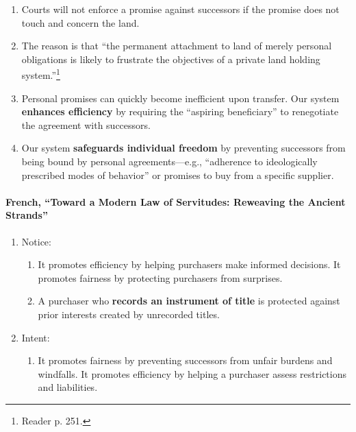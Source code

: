 \begin{enumerate}
    \item Courts will not enforce a promise against successors if the promise
    does not touch and concern the land.
    \item The reason is that ``the permanent attachment to land of merely 
    personal obligations is likely to frustrate the objectives of a private 
    land holding system.''\footnote{Reader p. 251.}
    \item Personal promises can quickly become inefficient upon transfer. Our 
    system \textbf{enhances efficiency} by requiring the ``aspiring 
    beneficiary'' to renegotiate the agreement with successors.
    \item Our system \textbf{safeguards individual freedom} by preventing 
    successors from being bound by personal agreements---e.g., ``adherence to 
    ideologically prescribed modes of behavior'' or promises to buy from a 
    specific supplier.
\end{enumerate}

\paragraph{French, ``Toward a Modern Law of Servitudes: Reweaving the Ancient 
Strands''}

\begin{enumerate}
    \item Notice:
    \begin{enumerate}
        \item It promotes efficiency by helping purchasers make informed 
        decisions. It promotes fairness by protecting purchasers from 
        surprises.
        \item A purchaser who \textbf{records an instrument of title} is 
        protected against prior interests created by unrecorded titles.
    \end{enumerate}
    \item Intent:
    \begin{enumerate}
        \item It promotes fairness by preventing successors from unfair 
        burdens and windfalls. It promotes efficiency by helping a purchaser 
        assess restrictions and liabilities.
    \end{enumerate}
\end{enumerate}

